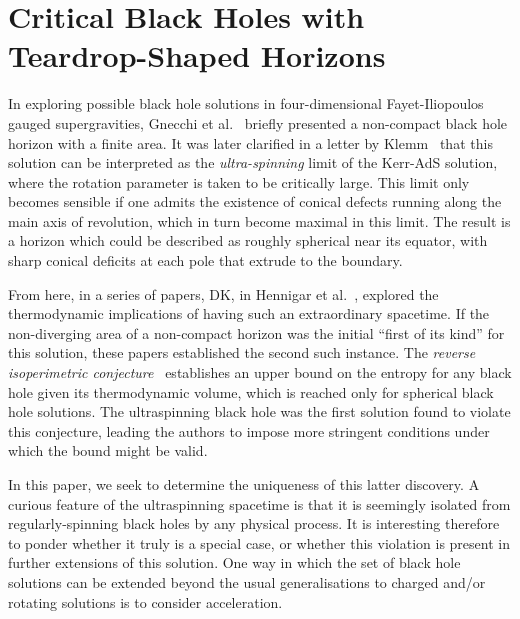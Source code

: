 \documentclass[
twoside,openright,frontopenright]{dmathesis}
\newcommand{\todoopt}[2][]{\todo[color=blue!20,size=\footnotesize,#1]{#2}}
\begin{document}
\chapter{Critical Black Holes with Teardrop-Shaped Horizons}
\label{chap:crit-bh}

In exploring possible black hole solutions in four-dimensional Fayet-Iliopoulos
gauged supergravities, Gnecchi et al.~\cite{Gnecchi:2013mja} briefly presented a
non-compact black hole horizon with a finite area. It was later clarified in a
letter by Klemm~\cite{Klemm:2014rda} that this solution can be interpreted as
the \emph{ultra-spinning} limit of the Kerr-AdS solution, where the rotation
parameter is taken to be critically large. This limit only becomes sensible if
one admits the existence of conical defects running along the main axis of
revolution, which in turn become maximal in this limit. The result is a horizon
which could be described as roughly spherical near its equator, with sharp
conical deficits at each pole that extrude to the boundary.

From here, in a series of papers, DK, in Hennigar et
al.~\cite{Hennigar:2015gan,Hennigar:2014cfa,Hennigar:2015cja}\todoopt{not sure
how to word this}, explored the thermodynamic implications of having such an
extraordinary spacetime. If the non-diverging area of a non-compact horizon was
the initial ``first of its kind'' for this solution, these papers established
the second such instance. The \emph{reverse isoperimetric
conjecture}~\cite{Dolan:2013ft,Cvetic:2010jb} establishes an upper bound on the
entropy for any black hole given its thermodynamic volume, which is reached only
for spherical black hole solutions. The ultraspinning black hole was the first
solution found to violate this conjecture, leading the authors to impose more
stringent conditions under which the bound might be valid.

In this paper, we seek to determine the uniqueness of this latter discovery. A
curious feature of the ultraspinning spacetime is that it is seemingly isolated
from regularly-spinning black holes by any physical process. It is interesting
therefore to ponder whether it truly is a special case, or whether this
violation is present in further extensions of this solution. One way in which
the set of black hole solutions can be extended beyond the usual generalisations
to charged and/or rotating solutions is to consider acceleration.
\end{document}
